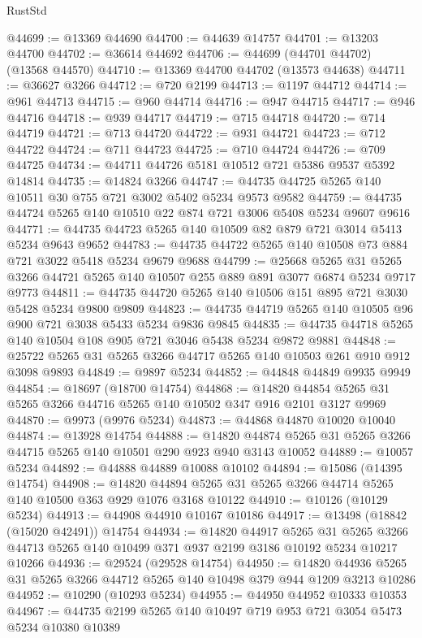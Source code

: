 \begin{lexlean}{RustStd}
\begin{coremodule}
@44699 := @13369 @44690
@44700 := @44639 @14757
@44701 := @13203 @44700
@44702 := @36614 @44692
@44706 := @44699 (@44701 @44702) (@13568 @44570)
@44710 := @13369 @44700 @44702 (@13573 @44638)
@44711 := @36627 @3266
@44712 := @720 @2199
@44713 := @1197 @44712
@44714 := @961 @44713
@44715 := @960 @44714
@44716 := @947 @44715
@44717 := @946 @44716
@44718 := @939 @44717
@44719 := @715 @44718
@44720 := @714 @44719
@44721 := @713 @44720
@44722 := @931 @44721
@44723 := @712 @44722
@44724 := @711 @44723
@44725 := @710 @44724
@44726 := @709 @44725
@44734 := @44711 @44726 @5181 @10512 @721 @5386 @9537 @5392 @14814
@44735 := @14824 @3266
@44747 := @44735 @44725 @5265 @140 @10511 @30 @755 @721 @3002 @5402 @5234 @9573 @9582
@44759 := @44735 @44724 @5265 @140 @10510 @22 @874 @721 @3006 @5408 @5234 @9607 @9616
@44771 := @44735 @44723 @5265 @140 @10509 @82 @879 @721 @3014 @5413 @5234 @9643 @9652
@44783 := @44735 @44722 @5265 @140 @10508 @73 @884 @721 @3022 @5418 @5234 @9679 @9688
@44799 := @25668
    @5265
    @31
    @5265
    @3266
    @44721
    @5265
    @140
    @10507
    @255
    @889
    @891
    @3077
    @6874
    @5234
    @9717
    @9773
@44811 := @44735 @44720 @5265 @140 @10506 @151 @895 @721 @3030 @5428 @5234 @9800 @9809
@44823 := @44735 @44719 @5265 @140 @10505 @96 @900 @721 @3038 @5433 @5234 @9836 @9845
@44835 := @44735 @44718 @5265 @140 @10504 @108 @905 @721 @3046 @5438 @5234 @9872 @9881
@44848 := @25722 @5265 @31 @5265 @3266 @44717 @5265 @140 @10503 @261 @910 @912 @3098 @9893
@44849 := @9897 @5234
@44852 := @44848 @44849 @9935 @9949
@44854 := @18697 (@18700 @14754)
@44868 := @14820 @44854 @5265 @31 @5265 @3266 @44716 @5265 @140 @10502 @347 @916 @2101 @3127 @9969
@44870 := @9973 (@9976 @5234)
@44873 := @44868 @44870 @10020 @10040
@44874 := @13928 @14754
@44888 := @14820 @44874 @5265 @31 @5265 @3266 @44715 @5265 @140 @10501 @290 @923 @940 @3143 @10052
@44889 := @10057 @5234
@44892 := @44888 @44889 @10088 @10102
@44894 := @15086 (@14395 @14754)
@44908 := @14820 @44894 @5265 @31 @5265 @3266 @44714 @5265 @140 @10500 @363 @929 @1076 @3168 @10122
@44910 := @10126 (@10129 @5234)
@44913 := @44908 @44910 @10167 @10186
@44917 := @13498 (@18842 (@15020 @42491)) @14754
@44934 := @14820
    @44917
    @5265
    @31
    @5265
    @3266
    @44713
    @5265
    @140
    @10499
    @371
    @937
    @2199
    @3186
    @10192
    @5234
    @10217
    @10266
@44936 := @29524 (@29528 @14754)
@44950 := @14820 @44936 @5265 @31 @5265 @3266 @44712 @5265 @140 @10498 @379 @944 @1209 @3213 @10286
@44952 := @10290 (@10293 @5234)
@44955 := @44950 @44952 @10333 @10353
@44967 := @44735 @2199 @5265 @140 @10497 @719 @953 @721 @3054 @5473 @5234 @10380 @10389

\end{coremodule}
\end{lexlean}
